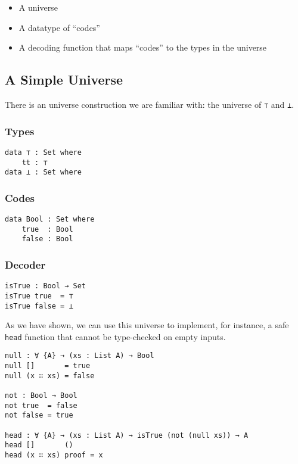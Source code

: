 \documentclass[\main/thesis.tex]{subfiles}
\begin{document}
\begin{itemize}
    \item A universe
    \item A datatype of ``codes''
    \item A decoding function that maps ``codes'' to the types in the universe
\end{itemize}

\subsection{A Simple Universe}

There is an universe construction we are familiar with: the universe
of \lstinline|⊤| and \lstinline|⊥|.

\subsubsection{Types}

\begin{lstlisting}
data ⊤ : Set where
    tt : ⊤
data ⊥ : Set where
\end{lstlisting}

\subsubsection{Codes}

\begin{lstlisting}
data Bool : Set where
    true  : Bool
    false : Bool
\end{lstlisting}

\subsubsection{Decoder}

\begin{lstlisting}
isTrue : Bool → Set
isTrue true  = ⊤
isTrue false = ⊥
\end{lstlisting}

As we have shown, we can use this universe to implement, for instance, a safe
\lstinline|head| function that cannot be type-checked on empty inputs.

\begin{lstlisting}
null : ∀ {A} → (xs : List A) → Bool
null []       = true
null (x ∷ xs) = false

not : Bool → Bool
not true  = false
not false = true

head : ∀ {A} → (xs : List A) → isTrue (not (null xs)) → A
head []       ()
head (x ∷ xs) proof = x
\end{lstlisting}
\end{document}
